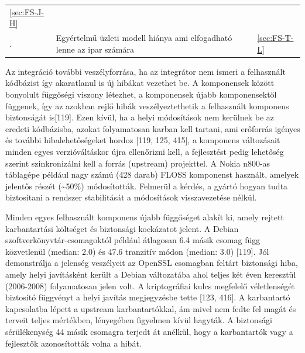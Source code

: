 \documentclass[12pt,magyar,a4paper,oneside]{scrreprt}
\begin{document}
\begin{longtable}[]{@{}lll@{}}
\begin{minipage}[t]{0.18\columnwidth}
\ref{sec:FS-J-H}\strut
\end{minipage}\tabularnewline
\begin{minipage}[t]{0.24\columnwidth}\raggedright
.\strut
\end{minipage} & \begin{minipage}[t]{0.49\columnwidth}\raggedright
Egyértelmű üzleti modell hiánya ami elfogadható lenne az ipar
számára\strut
\end{minipage} & \begin{minipage}[t]{0.18\columnwidth}\raggedright
\ref{sec:FS-T-L}\strut
\end{minipage}\tabularnewline
\bottomrule
\end{longtable}

Az integráció további veszélyforrása, ha az integrátor nem ismeri a
felhasznált kódbázist így akaratlanul is új hibákat vezethet be. A
komponensek között bonyolult függőségi viszony létezhet, a komponensek
újabb komponensektől függenek, így az azokban rejlő hibák
veszélyeztethetik a felhasznált komponens biztonságát is{[}119{]}. Ezen
kívül, ha a helyi módosítások nem kerülnek be az eredeti kódbázisba,
azokat folyamatosan karban kell tartani, ami erőforrás igényes és
további hibalehetőségeket hordoz {[}119, 125, 415{]}, a komponens
változásait minden egyes verzióváltáskor újra ellenőrizni kell, a
fejlesztést pedig lehetőség szerint szinkronizálni kell a forrás
(upstream) projekttel. A Nokia n800-as táblagépe például nagy számú (428
darab) FLOSS komponenst használt, amelyek jelentős részét
(\textasciitilde50\%) módosították. Felmerül a kérdés, a gyártó hogyan
tudta biztosítani a rendszer stabilitását a módosítások visszavezetése
nélkül.

Minden egyes felhasznált komponens újabb függőséget alakít ki, amely
rejtett karbantartási költséget és biztonsági kockázatot jelent. A
Debian szoftverkönyvtár-csomagoktól például átlagosan 6.4 másik csomag
függ közvetlenül (median: 2.0) és 47.6 tranzitív módon (median: 3.0)
{[}119{]}. Jól demonstrálja a jelenség veszélyeit az OpenSSL csomagban
feltárt biztonsági hiba, amely helyi javításként került a Debian
változatába ahol teljes két éven keresztül (2006-2008) folyamatosan
jelen volt. A kriptográfiai kulcs megfelelő véletlenségét biztosító
függvényt a helyi javítás megjegyzésbe tette {[}123, 416{]}. A
karbantartó kapcsolatba lépett a upstream karbantartókkal, ám mivel nem
fedte fel magát és terveit teljes mértékben, lényegében figyelmen kívül
hagyták. A biztonsági sérülékenység 44 másik csomagra terjedt át
anélkül, hogy a karbantartók vagy a fejlesztők azonosították volna a
hibát.
\end{document}
